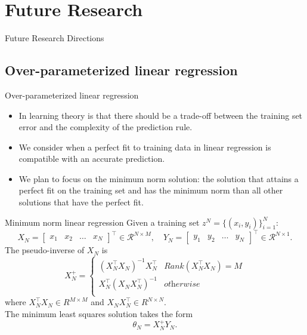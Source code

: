 \documentclass[aspectratio=169]{beamer}
\begin{document}
\section{Future Research}
\begin{frame}[c]
\begin{center}
\Huge Future Research Directions
\end{center}
\end{frame}

\subsection{Over-parameterized linear regression}
\begin{frame}{Over-parameterized linear regression}
\begin{itemize}
\setlength\itemsep{1.5em}
\item In learning theory is that there should be a trade-off between the training set error and the complexity of the prediction rule.
\item We consider when a perfect fit to training data in linear regression is compatible with an accurate prediction.
\item We plan to focus on the minimum norm solution: the solution that attains a perfect fit on the training set and has the minimum norm than all other solutions that have the perfect fit.
\end{itemize}
\end{frame}



\begin{frame}{Minimum norm linear regression}
Given a training set $z^N =\{(x_i,y_i)\}_{i=1}^N$:
\begin{equation} \label{eq:trainset_matrix}
X_N = 
\begin{bmatrix}
x_1 & x_2 & \dots & x_N
\end{bmatrix}^\top
\in \mathcal{R}^{N \times M},
\quad
Y_N = \begin{bmatrix} y_1 & y_2 & \dots & y_N \end{bmatrix}^\top
\in \mathcal{R}^{N \times 1}.
\end{equation}
The pseudo-inverse of $X_N$ is
\begin{equation} \label{eq:pseudo-inverse}
X_N^+ = 
\begin{cases} 
    (X_N^\top X_N)^{-1} X_N^\top & \textit{Rank}(X_N^\top X_N) = M\\ 
    X_N^\top (X_N X_N^\top )^{-1} & \textit{otherwise} \\   
\end{cases}
\end{equation}
where $X_N^\top X_N \in R^{M \times M}$ and $X_N X_N^\top \in R^{N \times N}$. 
\\
The minimum least squares solution takes the form
\begin{equation}
    \theta_N = X_N^+ Y_N.
\end{equation}
\end{frame}
\end{document}
